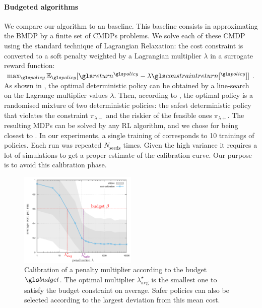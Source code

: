 \paragraph{Budgeted algorithms} We compare our \BFTQ algorithm to an \FTQl baseline. This baseline consists in approximating the BMDP by a finite set of CMDPs problems. We solve each of these CMDP using the standard technique of Lagrangian Relaxation: the cost constraint is converted to a soft penalty weighted by a Lagrangian multiplier $\lambda$ in a surrogate reward function: $\max_{\policy} \expectedvalue_{\policy}[\return^{\policy} - \lambda \constraintreturn[^{\policy}]]$.
As shown in , the optimal deterministic policy can be obtained by a line-search on the Lagrange multiplier values $\lambda$.
Then, according to \citet[Theorem 4.4]{BEUTLER1985236}, the optimal policy is a randomised mixture of two deterministic policies: the safest deterministic policy that violates the constraint $\pi_{\lambda-}$ and the riskier of the feasible ones $\pi_{\lambda+}$.
The resulting \glspl{MDP} can be solved by any RL algorithm, and we chose \FTQ for being closest to \BFTQ.
In our experiments, a single training of \BFTQ corresponds to 10 trainings of \FTQl policies. Each run was repeated $N_{\text{seeds}}$ times. Given the high variance it requires a lot of simulations to get a proper estimate of the calibration curve. Our purpose is to avoid this calibration phase.

\begin{figure}[tp]
	\centering
	\includegraphics[width=0.5\textwidth]{img/CalibrationExample}
	\caption{Calibration of a penalty multiplier according to the budget $\budget$. The optimal multiplier $\lambda^{\star}_{\text{avg}}$ is the smallest one to satisfy the budget constraint on average. Safer policies can also be selected according to the largest deviation from this mean cost.}
	\label{fig:Lagrangian}
\end{figure}



